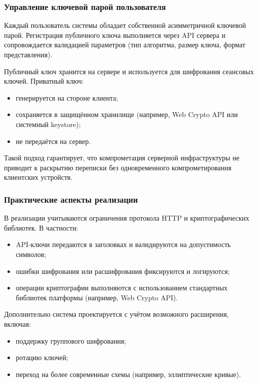 \documentclass{article}
\begin{document}
\subsubsection{Управление ключевой парой пользователя}

Каждый пользователь системы обладает собственной асимметричной ключевой парой. Регистрация публичного ключа выполняется через API сервера и сопровождается валидацией параметров (тип алгоритма, размер ключа, формат представления).

Публичный ключ хранится на сервере и используется для шифрования сеансовых ключей. Приватный ключ:
\begin{itemize}
\item генерируется на стороне клиента;
\item сохраняется в защищённом хранилище (например, Web Crypto API или системный keystore);
\item не передаётся на сервер.
\end{itemize}

Такой подход гарантирует, что компрометация серверной инфраструктуры не приводит к раскрытию переписки без одновременного компрометирования клиентских устройств.

\subsubsection{Практические аспекты реализации}

В реализации учитываются ограничения протокола HTTP и криптографических библиотек. В частности:
\begin{itemize}
\item API-ключи передаются в заголовках и валидируются на допустимость символов;
\item ошибки шифрования или расшифрования фиксируются и логируются;
\item операции криптографии выполняются с использованием стандартных библиотек платформы (например, Web Crypto API).
\end{itemize}

Дополнительно система проектируется с учётом возможного расширения, включая:
\begin{itemize}
\item поддержку группового шифрования;
\item ротацию ключей;
\item переход на более современные схемы (например, эллиптические кривые).
\end{itemize}
\end{document}
